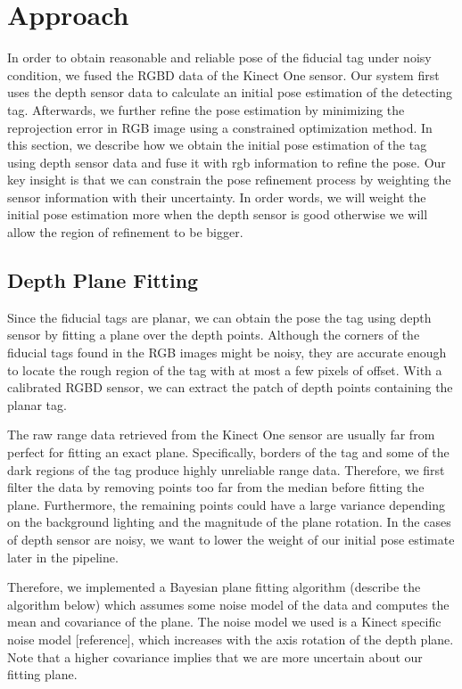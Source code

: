 \section{Approach}
\label{sec:approach}
In order to obtain reasonable and reliable pose of the fiducial tag under noisy condition, we fused the RGBD data of the Kinect One sensor. Our system first uses the depth sensor data to calculate an initial pose estimation of the detecting tag. Afterwards, we further refine the pose estimation by minimizing the reprojection error in RGB image using a constrained optimization method. In this section, we describe how we obtain the initial pose estimation of the tag using depth sensor data and fuse it with rgb information to refine the pose. Our key insight is that we can constrain the pose refinement process by weighting the sensor information with their uncertainty. In order words, we will weight the initial pose estimation more when the depth sensor is good otherwise we will allow the region of refinement to be bigger. 

\subsection{Depth Plane Fitting}
Since the fiducial tags are planar, we can obtain the pose the tag using depth sensor by fitting a plane over the depth points. Although the corners of the fiducial tags found in the RGB images might be noisy, they are accurate enough to locate the rough region of the tag with at most a few pixels of offset. With a calibrated RGBD sensor, we can extract the patch of depth points containing the planar tag. 

The raw range data retrieved from the Kinect One sensor are usually far from perfect for fitting an exact plane. Specifically, borders of the tag and some of the dark regions of the tag produce highly unreliable range data. Therefore, we first filter the data by removing points too far from the median before fitting the plane. Furthermore, the remaining points could have a large variance depending on the background lighting and the magnitude of the plane rotation. In the cases of depth sensor are noisy, we want to lower the weight of our initial pose estimate later in the pipeline. 

Therefore, we implemented a Bayesian plane fitting algorithm (describe the algorithm below) which assumes some noise model of the data and computes the mean and covariance of the plane. The noise model we used is a Kinect specific noise model [reference], which increases with the axis rotation of the depth plane. Note that a higher covariance implies that we are more uncertain about our fitting plane.

